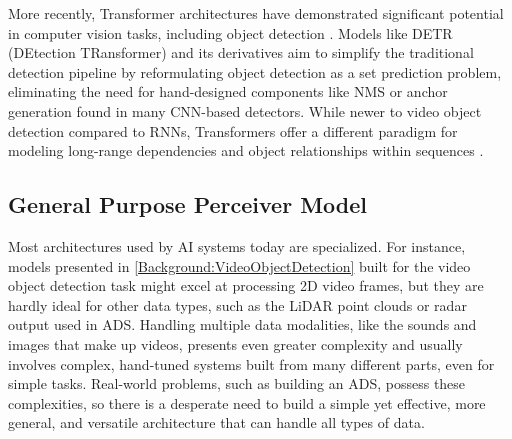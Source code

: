 More recently, Transformer architectures \cite{vaswaniAttentionAllYou2017} have demonstrated significant potential in computer vision tasks, including object detection \cite{carionEndToEndObjectDetection2020, zhuDeformableDETRDeformable2021}. Models like DETR (DEtection TRansformer) \cite{carionEndToEndObjectDetection2020, zhuDeformableDETRDeformable2021} and its derivatives aim to simplify the traditional detection pipeline by reformulating object detection as a set prediction problem, eliminating the need for hand-designed components like NMS or anchor generation found in many CNN-based detectors. While newer to video object detection compared to RNNs, Transformers offer a different paradigm for modeling long-range dependencies and object relationships within sequences \cite{wangEndtoEndVideoObject2021, shvetsTrackingObjectsAs2021}.

\subsection{General Purpose Perceiver Model} \label{Background:Perceiver}

Most architectures used by AI systems today are specialized. For instance, models presented in \ref{Background:VideoObjectDetection} built for the video object detection task might excel at processing 2D video frames, but they are hardly ideal for other data types, such as the LiDAR point clouds or radar output used in ADS. Handling multiple data modalities, like the sounds and images that make up videos, presents even greater complexity and usually involves complex, hand-tuned systems built from many different parts, even for simple tasks. Real-world problems, such as building an ADS, possess these complexities, so there is a desperate need to build a simple yet effective, more general, and versatile architecture that can handle all types of data.

